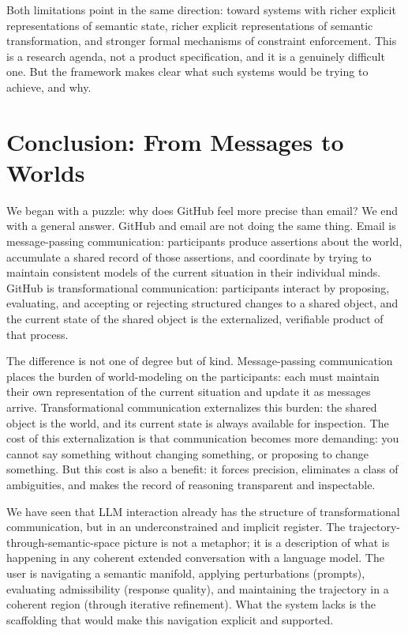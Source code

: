 \documentclass[12pt, letterpaper]{article}
\begin{document}
Both limitations point in the same direction: toward systems with richer explicit representations of semantic state, richer explicit representations of semantic transformation, and stronger formal mechanisms of constraint enforcement. This is a research agenda, not a product specification, and it is a genuinely difficult one. But the framework makes clear what such systems would be trying to achieve, and why.

\section{Conclusion: From Messages to Worlds}

We began with a puzzle: why does GitHub feel more precise than email? We end with a general answer. GitHub and email are not doing the same thing. Email is message-passing communication: participants produce assertions about the world, accumulate a shared record of those assertions, and coordinate by trying to maintain consistent models of the current situation in their individual minds. GitHub is transformational communication: participants interact by proposing, evaluating, and accepting or rejecting structured changes to a shared object, and the current state of the shared object is the externalized, verifiable product of that process.

The difference is not one of degree but of kind. Message-passing communication places the burden of world-modeling on the participants: each must maintain their own representation of the current situation and update it as messages arrive. Transformational communication externalizes this burden: the shared object is the world, and its current state is always available for inspection. The cost of this externalization is that communication becomes more demanding: you cannot say something without changing something, or proposing to change something. But this cost is also a benefit: it forces precision, eliminates a class of ambiguities, and makes the record of reasoning transparent and inspectable.

We have seen that LLM interaction already has the structure of transformational communication, but in an underconstrained and implicit register. The trajectory-through-semantic-space picture is not a metaphor; it is a description of what is happening in any coherent extended conversation with a language model. The user is navigating a semantic manifold, applying perturbations (prompts), evaluating admissibility (response quality), and maintaining the trajectory in a coherent region (through iterative refinement). What the system lacks is the scaffolding that would make this navigation explicit and supported.
\end{document}
